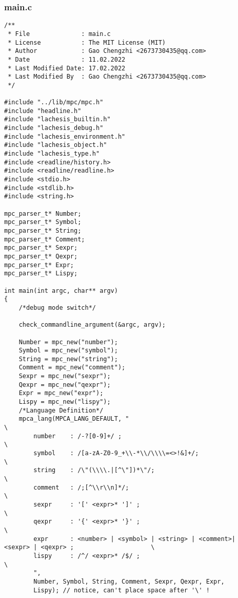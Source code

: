 \hypertarget{main.c}{%
\subsubsection{main.c}\label{main.c}}

\begin{verbatim}
/**
 * File              : main.c
 * License           : The MIT License (MIT)
 * Author            : Gao Chengzhi <2673730435@qq.com>
 * Date              : 11.02.2022
 * Last Modified Date: 17.02.2022
 * Last Modified By  : Gao Chengzhi <2673730435@qq.com>
 */

#include "../lib/mpc/mpc.h"
#include "headline.h"
#include "lachesis_builtin.h"
#include "lachesis_debug.h"
#include "lachesis_environment.h"
#include "lachesis_object.h"
#include "lachesis_type.h"
#include <readline/history.h>
#include <readline/readline.h>
#include <stdio.h>
#include <stdlib.h>
#include <string.h>

mpc_parser_t* Number;
mpc_parser_t* Symbol;
mpc_parser_t* String;
mpc_parser_t* Comment;
mpc_parser_t* Sexpr;
mpc_parser_t* Qexpr;
mpc_parser_t* Expr;
mpc_parser_t* Lispy;

int main(int argc, char** argv)
{
    /*debug mode switch*/

    check_commandline_argument(&argc, argv);

    Number = mpc_new("number");
    Symbol = mpc_new("symbol");
    String = mpc_new("string");
    Comment = mpc_new("comment");
    Sexpr = mpc_new("sexpr");
    Qexpr = mpc_new("qexpr");
    Expr = mpc_new("expr");
    Lispy = mpc_new("lispy");
    /*Language Definition*/
    mpca_lang(MPCA_LANG_DEFAULT, "                                      \
        number    : /-?[0-9]+/ ;                                        \
        symbol    : /[a-zA-Z0-9_+\\-*\\/\\\\=<>!&]+/;                   \
        string    : /\"(\\\\.|[^\"])*\"/;                               \
        comment   : /;[^\\r\\n]*/;                                      \
        sexpr     : '[' <expr>* ']' ;                                   \
        qexpr     : '{' <expr>* '}' ;                                   \
        expr      : <number> | <symbol> | <string> | <comment>| <sexpr> | <qexpr> ;                     \
        lispy     : /^/ <expr>* /$/ ;                                   \
        ",
        Number, Symbol, String, Comment, Sexpr, Qexpr, Expr,
        Lispy); // notice, can't place space after '\' !


\end{verbatim}

